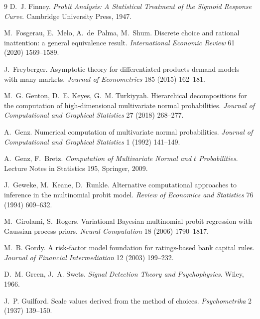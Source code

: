 \documentclass[12pt]{article}
\theoremstyle{remark}
\begin{document}
\begin{thebibliography}{9}
 D.~J. Finney. \emph{Probit
Analysis: A Statistical Treatment of the Sigmoid Response Curve}.
Cambridge University Press, 1947.

 M.~Fosgerau, E.~Melo, A.~de~Palma, M.~Shum. Discrete
choice and rational inattention: a general equivalence result.
\emph{International Economic Review} 61 (2020) 1569--1589.

 J.~Freyberger. Asymptotic
theory for differentiated products demand models with many markets.
\emph{Journal of Econometrics} 185 (2015) 162--181.

M.~G. Genton, D.~E. Keyes, G.~M. Turkiyyah. Hierarchical decompositions for
the computation of high-dimensional multivariate normal probabilities.
\emph{Journal of Computational and Graphical Statistics} 27 (2018)
268--277.

 A.~Genz. Numerical computation of multivariate normal
probabilities. \emph{Journal of Computational and Graphical
Statistics} 1 (1992)
141--149.

 A.~Genz, F.~Bretz.
\emph{Computation of Multivariate Normal and $t$ Probabilities}. Lecture
Notes in Statistics 195, Springer, 2009.

 J.~Geweke, M.~Keane, D.~Runkle. Alternative computational
approaches to inference in the multinomial probit model. \emph{Review of
Economics and Statistics} 76 (1994) 609--632.

 M.~Girolami,
S.~Rogers. Variational Bayesian multinomial probit regression with
Gaussian process priors. \emph{Neural Computation} 18 (2006) 1790--1817.

 M.~B. Gordy. A risk-factor model
foundation for ratings-based bank capital rules. \emph{Journal of
Financial Intermediation} 12 (2003) 199--232.

 D.~M. Green, J.~A. Swets.
\emph{Signal Detection Theory and Psychophysics}. Wiley, 1966.

 J.~P. Guilford. Scale values
derived from the method of choices. \emph{Psychometrika} 2 (1937)
139--150.


\end{thebibliography}
\end{document}
